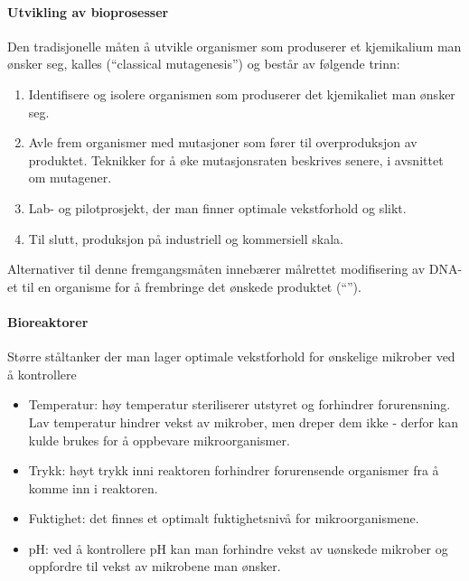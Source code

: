 \paragraph{Utvikling av bioprosesser} Den tradisjonelle måten å utvikle organismer som produserer et kjemikalium man ønsker seg, kalles  (``classical mutagenesis'') og består av følgende trinn:
\begin{enumerate}
	\item Identifisere og isolere organismen som produserer det kjemikaliet man ønsker seg.
	\item Avle frem organismer med mutasjoner som fører til overproduksjon av produktet. Teknikker for å øke mutasjonsraten beskrives senere, i avsnittet om mutagener.
	\item Lab- og pilotprosjekt, der man finner optimale vekstforhold og slikt.
	\item Til slutt, produksjon på industriell og kommersiell skala.
\end{enumerate}
Alternativer til denne fremgangsmåten innebærer målrettet modifisering av DNA-et til en organisme for å frembringe det ønskede produktet (``'').

\paragraph{Bioreaktorer} Større ståltanker der man lager optimale vekstforhold for ønskelige mikrober ved å kontrollere
\begin{itemize}[nolistsep,noitemsep]
	\item Temperatur: høy temperatur steriliserer utstyret og forhindrer forurensning. Lav temperatur hindrer vekst av mikrober, men dreper dem ikke - derfor kan kulde brukes for å oppbevare mikroorganismer. 
	\item Trykk: høyt trykk inni reaktoren forhindrer forurensende organismer fra å komme inn i reaktoren. 
	\item Fuktighet: det finnes et optimalt fuktighetsnivå for mikroorganismene.
	\item pH: ved å kontrollere pH kan man forhindre vekst av uønskede mikrober og oppfordre til vekst av mikrobene man ønsker.
\end{itemize}


